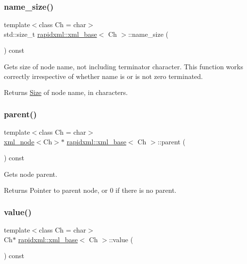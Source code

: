 \subsubsection{\texorpdfstring{name\+\_\+size()}{name\_size()}}
{\footnotesize\ttfamily template$<$class Ch  = char$>$ \\
std\+::size\+\_\+t \hyperlink{classrapidxml_1_1xml__base}{rapidxml\+::xml\+\_\+base}$<$ Ch $>$\+::name\+\_\+size (\begin{DoxyParamCaption}{ }\end{DoxyParamCaption}) const\hspace{0.3cm}{\ttfamily [inline]}}

Gets size of node name, not including terminator character. This function works correctly irrespective of whether name is or is not zero terminated. \begin{DoxyReturn}{Returns}
\hyperlink{classSize}{Size} of node name, in characters. 
\end{DoxyReturn}
\mbox{\label{classrapidxml_1_1xml__base_aa807062868d671a8c798d9d1bf016988}} 
\subsubsection{\texorpdfstring{parent()}{parent()}}
{\footnotesize\ttfamily template$<$class Ch  = char$>$ \\
\hyperlink{classrapidxml_1_1xml__node}{xml\+\_\+node}$<$Ch$>$$\ast$ \hyperlink{classrapidxml_1_1xml__base}{rapidxml\+::xml\+\_\+base}$<$ Ch $>$\+::parent (\begin{DoxyParamCaption}{ }\end{DoxyParamCaption}) const\hspace{0.3cm}{\ttfamily [inline]}}

Gets node parent. \begin{DoxyReturn}{Returns}
Pointer to parent node, or 0 if there is no parent. 
\end{DoxyReturn}
\mbox{\label{classrapidxml_1_1xml__base_a6af65de5e59ac497cd69838f8a89d602}} 
\subsubsection{\texorpdfstring{value()}{value()}\hspace{0.1cm}{\footnotesize\ttfamily [1/3]}}
{\footnotesize\ttfamily template$<$class Ch  = char$>$ \\
Ch$\ast$ \hyperlink{classrapidxml_1_1xml__base}{rapidxml\+::xml\+\_\+base}$<$ Ch $>$\+::value (\begin{DoxyParamCaption}{ }\end{DoxyParamCaption}) const\hspace{0.3cm}{\ttfamily [inline]}}

